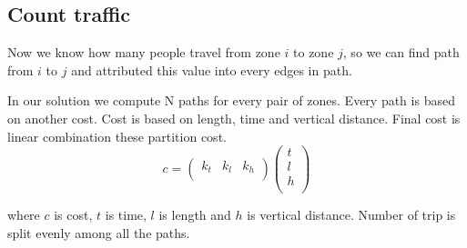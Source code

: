 \subsection{Count traffic}
Now we know how many people travel from zone $i$ to zone $j$, so we can find path from $i$ to $j$ and 
attributed this value into every edges in path.

In our solution we compute N paths for every pair of zones. Every path is based on another cost. Cost is based on length, time and vertical distance. Final cost is linear combination these partition cost.
$$c = \left(\begin{array}{ccc}
k_t & k_l & k_h\\
\end{array}\right) \left( \begin{array}{c}
t\\
l\\
h\\
\end{array} \right)$$

where $c$ is cost, $t$ is time, $l$ is length and $h$ is vertical distance. Number of trip is split evenly among all the paths.